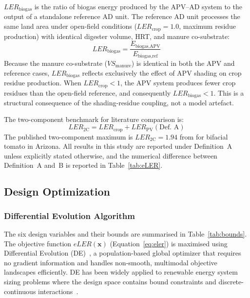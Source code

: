 \textbf{$LER_{\text{biogas}}$} is the ratio of biogas energy produced
by the APV--AD system to the output of a standalone reference AD unit.
The reference AD unit processes the same land area under open-field
conditions ($LER_{\text{crop}} = 1.0$, maximum residue production)
with identical digester volume, HRT, and manure co-substrate:
\begin{equation}
	LER_{\text{biogas}} =
	\frac{E_{\text{biogas,APV}}}{E_{\text{biogas,ref}}}
	\label{eq:lerbiogas}
\end{equation}
Because the manure co-substrate ($VS_{\text{manure}}$) is identical
in both the APV and reference cases, $LER_{\text{biogas}}$ reflects
exclusively the effect of APV shading on crop residue production.
When $LER_{\text{crop}} < 1$, the APV system produces fewer crop
residues than the open-field reference, and consequently
$LER_{\text{biogas}} < 1$. This is a structural consequence of
the shading-residue coupling, not a model artefact.

The two-component benchmark for literature comparison is:
\begin{equation}
	LER_{\text{2C}} = LER_{\text{crop}} + LER_{\text{PV}}(\text{Def.~A})
	\label{eq:ler2c}
\end{equation}
The published two-component maximum is $LER_{\text{2C}} = 1.94$
from \citet{riaz2022} for bifacial tomato in Arizona. All results in
this study are reported under Definition~A unless explicitly stated
otherwise, and the numerical difference between Definition~A and~B
is reported in Table~\ref{tab:eLER}.

\subsection{Design Optimization}
\label{sec:optimizer}

\subsubsection{Differential Evolution Algorithm}

\hspace{1cm}The six design variables and their bounds are summarised in
Table~\ref{tab:bounds}. The objective function $eLER(\mathbf{x})$
(Equation~\ref{eq:eler}) is maximised using Differential Evolution
(DE)~\citep{storn1997}, a population-based global optimizer that
requires no gradient information and handles non-smooth, multimodal
objective landscapes efficiently. DE has been widely applied to
renewable energy system sizing problems where the design space
contains bound constraints and discrete-continuous
interactions~\citep{oprea2024}.


